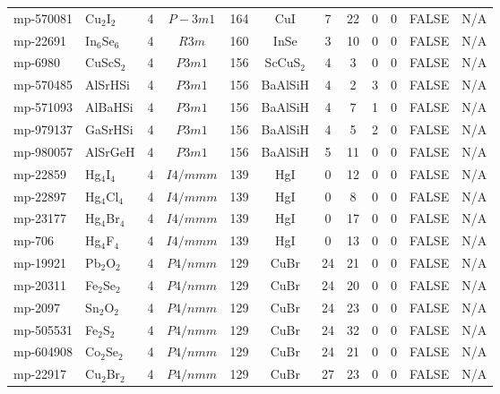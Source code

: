 {\begin{longtable}{llcccccccccc}
    mp-570081 & Cu$_{2}$I$_{2}$ & 4     & $P-3m1$ & 164   & CuI   & 7     & 22    & 0     & 0     & FALSE & N/A \\
    mp-22691 & In$_{6}$Se$_{6}$ & 4     & $R3m$ & 160   & InSe  & 3     & 10    & 0     & 0     & FALSE & N/A \\
    mp-6980 & CuScS$_{2}$ & 4     & $P3m1$ & 156   & ScCuS$_{2}$ & 4     & 3     & 0     & 0     & FALSE & N/A \\
    mp-570485 & AlSrHSi & 4     & $P3m1$ & 156   & BaAlSiH & 4     & 2     & 3     & 0     & FALSE & N/A \\
    mp-571093 & AlBaHSi & 4     & $P3m1$ & 156   & BaAlSiH & 4     & 7     & 1     & 0     & FALSE & N/A \\
    mp-979137 & GaSrHSi & 4     & $P3m1$ & 156   & BaAlSiH & 4     & 5     & 2     & 0     & FALSE & N/A \\
    mp-980057 & AlSrGeH & 4     & $P3m1$ & 156   & BaAlSiH & 5     & 11    & 0     & 0     & FALSE & N/A \\
    mp-22859 & Hg$_{4}$I$_{4}$ & 4     & $I4/mmm$ & 139   & HgI   & 0     & 12    & 0     & 0     & FALSE & N/A \\
    mp-22897 & Hg$_{4}$Cl$_{4}$ & 4     & $I4/mmm$ & 139   & HgI   & 0     & 8     & 0     & 0     & FALSE & N/A \\
    mp-23177 & Hg$_{4}$Br$_{4}$ & 4     & $I4/mmm$ & 139   & HgI   & 0     & 17    & 0     & 0     & FALSE & N/A \\
    mp-706 & Hg$_{4}$F$_{4}$ & 4     & $I4/mmm$ & 139   & HgI   & 0     & 13    & 0     & 0     & FALSE & N/A \\
    mp-19921 & Pb$_{2}$O$_{2}$ & 4     & $P4/nmm$ & 129   & CuBr  & 24    & 21    & 0     & 0     & FALSE & N/A \\
    mp-20311 & Fe$_{2}$Se$_{2}$ & 4     & $P4/nmm$ & 129   & CuBr  & 24    & 20    & 0     & 0     & FALSE & N/A \\
    mp-2097 & Sn$_{2}$O$_{2}$ & 4     & $P4/nmm$ & 129   & CuBr  & 24    & 23    & 0     & 0     & FALSE & N/A \\
    mp-505531 & Fe$_{2}$S$_{2}$ & 4     & $P4/nmm$ & 129   & CuBr  & 24    & 32    & 0     & 0     & FALSE & N/A \\
    mp-604908 & Co$_{2}$Se$_{2}$ & 4     & $P4/nmm$ & 129   & CuBr  & 24    & 21    & 0     & 0     & FALSE & N/A \\
    mp-22917 & Cu$_{2}$Br$_{2}$ & 4     & $P4/nmm$ & 129   & CuBr  & 27    & 23    & 0     & 0     & FALSE & N/A \\

\end{longtable}}
